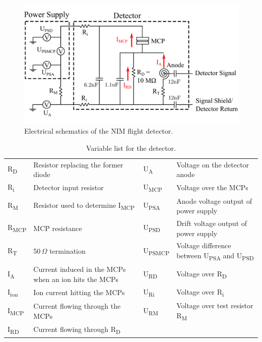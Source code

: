 		\begin{figure}[h]
			\centering
			\includegraphics[width = .8\textwidth]{Bilder/Detector_elec_schema.png}
			\caption{Electrical schematics of the NIM flight detector.}
			\label{fig:FlighElecSchema}
		\end{figure}
		
		
		\begin{table}[h]
			\begin{center}
			\begin{tabular}{|m{1.5cm}|m{5.4cm}|m{1.5cm}|m{5.4cm}|}
				\hline
				R\textsubscript{D}& Resistor replacing the former diode & U\textsubscript{A}& Voltage on the detector anode \\
				R\textsubscript{i} & Detector input resistor & U\textsubscript{MCP}& Voltage over the MCPs \\
				R\textsubscript{M}& Resistor used to determine I\textsubscript{MCP} &U\textsubscript{PSA} & Anode voltage output of power supply \\
				R\textsubscript{MCP}& MCP resistance & U\textsubscript{PSD} & Drift voltage output of power supply \\
				R\textsubscript{T} & 50\,$\Omega$ termination & U\textsubscript{PSMCP} & Voltage difference  between U\textsubscript{PSA} and U\textsubscript{PSD} \\
				I\textsubscript{A} & Current induced in the MCPs when an ion hits the MCPs & U\textsubscript{RD}& Voltage over R\textsubscript{D} \\
				I\textsubscript{ion} & Ion current hitting the MCPs & U\textsubscript{Ri}& Voltage over R\textsubscript{i} \\
				I\textsubscript{MCP} & Current flowing through the MCPs &U\textsubscript{RM}& Voltage over test resistor R\textsubscript{M}\\
				I\textsubscript{RD} & Current flowing through R\textsubscript{D} &&\\
				\hline
			\end{tabular}
			\end{center}
			\caption{Variable list for the detector.}
			\label{tab:ElecSchemaVariableList}
		\end{table}
	
